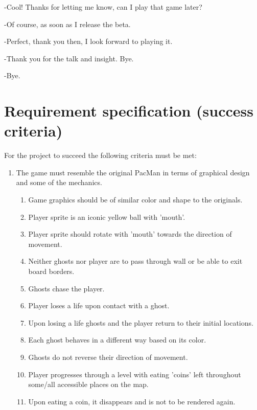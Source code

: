 \documentclass[11pt,a4paper,notitlepage]{report}
\begin{document}
			-Cool! Thanks for letting me know, can I play that game later?
			
			-Of course, as soon as I release the beta.
			
			-Perfect, thank you then, I look forward to playing it.
			
			-Thank you for the talk and insight. Bye.
			
			-Bye.
		\section{Requirement specification (success criteria)}
			For the project to succeed the following criteria must be met:\\
			\begin{enumerate}
				\item 
				The game must resemble the original PacMan in terms of graphical design and some of the mechanics.
				\begin{enumerate}
					\item
						Game graphics should be of similar color and shape to the originals.
						\label{req-orig-colors}
					\item
						Player sprite is an iconic yellow ball with 'mouth'.
						\label{req-player-shape}
					\item
						Player sprite should rotate with 'mouth' towards the direction of movement. 
						\label{req-player-rotation}
					\item
						Neither ghosts nor player are to pass through wall or be able to exit board borders.
						\label{req-walls-not-passable}
					\item
						Ghosts chase the player.
						\label{req-ghost-movement}
					\item
						Player loses a life upon contact with a ghost.
						\label{req-life-loss}
					\item
						Upon losing a life ghosts and the player return to their initial locations.
						\label{req-reset}
					\item
						Each ghost behaves in a different way based on its color.
						\label{req-ghost-differences}
					\item
						Ghosts do not reverse their direction of movement.
						\label{req-ghost-not-reversing}
					\item
						Player progresses through a level with eating 'coins' left throughout some/all accessible places on the map.
						\label{req-level-progress}
					\item
						Upon eating a coin, it disappears and is not to be rendered again.

\end{enumerate}
\end{enumerate}
\end{document}
